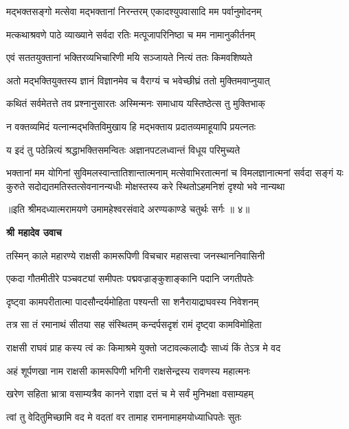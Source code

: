 \twolineshloka
{मद्भक्तसङ्गो मत्सेवा मद्भक्तानां निरन्तरम्}
{एकादश्युपवासादि मम पर्वानुमोदनम्} %

\twolineshloka
{मत्कथाश्रवणे पाठे व्याख्याने सर्वदा रतिः}
{मत्पूजापरिनिष्ठा च मम नामानुकीर्तनम्} %

\twolineshloka
{एवं सततयुक्तानां भक्तिरव्यभिचारिणी}
{मयि सञ्जायते नित्यं ततः किमवशिष्यते} %

\twolineshloka
{अतो मद्भक्तियुक्तस्य ज्ञानं विज्ञानमेव च}
{वैराग्यं च भवेच्छीघ्रं ततो मुक्तिमवाप्नुयात्} %

\twolineshloka
{कथितं सर्वमेतत्ते तव प्रश्नानुसारतः}
{अस्मिन्मनः समाधाय यस्तिष्ठेत्स तु मुक्तिभाक्} %

\twolineshloka
{न वक्तव्यमिदं यत्नान्मद्भक्तिविमुखाय हि}
{मद्भक्ताय प्रदातव्यमाहूयापि प्रयत्नतः} %

\twolineshloka
{य इदं तु पठेन्नित्यं श्रद्धाभक्तिसमन्वितः}
{अज्ञानपटलध्वान्तं विधूय परिमुच्यते} %

\fourlineindentedshloka
{भक्तानां मम योगिनां सुविमलस्वान्तातिशान्तात्मनाम्}
{मत्सेवाभिरतात्मनां च विमलज्ञानात्मनां सर्वदा}
{सङ्गं यः कुरुते सदोद्यतमतिस्तत्सेवनानन्यधीः}
{मोक्षस्तस्य करे स्थितोऽहमनिशं दृश्यो भवे नान्यथा} %

{॥इति श्रीमदध्यात्मरामयणे उमामहेश्वरसंवादे
अरण्यकाण्डे चतुर्थः सर्गः ॥ ४॥
}




\textbf{श्री महादेव उवाच}

\twolineshloka
{तस्मिन् काले महारण्ये राक्षसी कामरूपिणी}
{विचचार महासत्त्वा जनस्थाननिवासिनी} %

\twolineshloka
{एकदा गौतमीतीरे पञ्चवट्यां समीपतः}
{पद्मवज्राङ्कुशाङ्कानि पदानि जगतीपतेः} %

\twolineshloka
{दृष्ट्वा कामपरीतात्मा पादसौन्दर्यमोहिता}
{पश्यन्ती सा शनैरायाद्राघवस्य निवेशनम्} %

\twolineshloka
{तत्र सा तं रमानाथं सीतया सह संस्थितम्}
{कन्दर्पसदृशं रामं दृष्ट्वा कामविमोहिता} %

\twolineshloka
{राक्षसी राघवं प्राह कस्य त्वं कः किमाश्रमे}
{युक्तो जटावल्कलाद्यैः साध्यं किं तेऽत्र मे वद} %

\twolineshloka
{अहं शूर्पणखा नाम राक्षसी कामरूपिणी}
{भगिनी राक्षसेन्द्रस्य रावणस्य महात्मनः} %

\twolineshloka
{खरेण सहिता भ्रात्रा वसाम्यत्रैव कानने}
{राज्ञा दत्तं च मे सर्वं मुनिभक्षा वसाम्यहम्} %

\twolineshloka
{त्वां तु वेदितुमिच्छामि वद मे वदतां वर}
{तामाह रामनामाहमयोध्याधिपतेः सुतः} %


